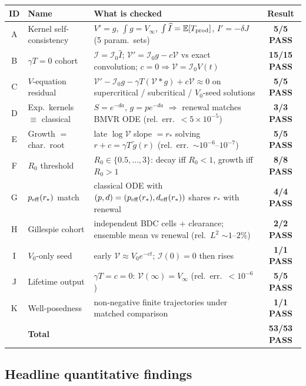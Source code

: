 \documentclass[11pt,a4paper]{article}
\newcommand{\E}{\mathbb{E}}
\newcommand{\Ihat}{\widehat{I}}
\newcommand{\Icell}{\mathcal{I}}
\newcommand{\Vfree}{\mathcal{V}}
\newcommand{\Lap}[1]{\widetilde{#1}}
\theoremstyle{plain}
\theoremstyle{definition}
\theoremstyle{remark}
\begin{document}
\begin{center}
\renewcommand{\arraystretch}{1.2}
{\small
\begin{tabular}{@{}clp{}c@{}}
\toprule
ID & Name & What is checked & Result \\
\midrule
A & Kernel self-consistency &
  $V'=g$, $\int g=V_\infty$, $\int\Ihat=\E[T_{\rm prod}]$, $I'=-\delta J$
  (5 param.\ sets) &
  \textbf{5/5 PASS} \\
B & $\gamma T=0$ cohort &
  $\Icell=\Icell_0\Ihat$;
  $\Vfree'=\Icell_0 g-c\Vfree$ vs exact convolution;
  $c=0\Rightarrow\Vfree=\Icell_0 V(t)$ &
  \textbf{15/15 PASS} \\
C & $V$-equation residual &
  $\Vfree'-\Icell_0 g-\gamma T(\Vfree*g)+c\Vfree\approx 0$
  on supercritical / subcritical / $V_0$-seed solutions &
  \textbf{5/5 PASS} \\
D & Exp.\ kernels $\equiv$ classical &
  $S=e^{-da}$, $g=p e^{-da}$ $\Rightarrow$ renewal matches BMVR ODE
  (rel.\ err.\ $<5\times 10^{-5}$) &
  \textbf{3/3 PASS} \\
E & Growth $=$ char.\ root &
  late $\log\Vfree$ slope $=r_*$ solving
  $r+c=\gamma T\,\Lap{g}(r)$ (rel.\ err.\ $\sim 10^{-6}$--$10^{-7}$) &
  \textbf{5/5 PASS} \\
F & $R_0$ threshold &
  $R_0\in\{0.5,\ldots,3\}$: decay iff $R_0<1$, growth iff $R_0>1$ &
  \textbf{8/8 PASS} \\
G & $p_{\rm eff}(r_*)$ match &
  classical ODE with $(p,d)=(p_{\rm eff}(r_*),d_{\rm eff}(r_*))$ shares $r_*$
  with renewal &
  \textbf{4/4 PASS} \\
H & Gillespie cohort &
  independent BDC cells + clearance; ensemble mean vs renewal
  (rel.\ $L^2$ $\sim 1$--$2\%$) &
  \textbf{2/2 PASS} \\
I & $V_0$-only seed &
  early $\Vfree\approx V_0 e^{-ct}$; $\Icell(0)=0$ then rises &
  \textbf{1/1 PASS} \\
J & Lifetime output &
  $\gamma T=c=0$: $\Vfree(\infty)=V_\infty$ (rel.\ err.\ $<10^{-6}$) &
  \textbf{5/5 PASS} \\
K & Well-posedness &
  non-negative finite trajectories under matched comparison &
  \textbf{1/1 PASS} \\
\midrule
 & \textbf{Total} & & \textbf{53/53 PASS} \\
\bottomrule
\end{tabular}}
\end{center}

\subsection{Headline quantitative findings}
\end{document}
